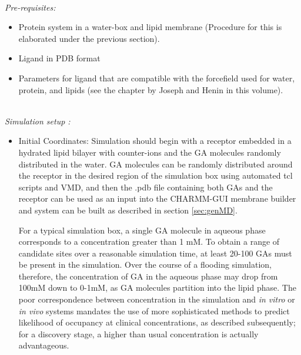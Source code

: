 \documentclass[12pt]{article}
\begin{document}
\hfill \break
\\
\textit{Pre-requisites:} 
\begin{itemize}
  \item Protein system in a water-box and lipid membrane (Procedure for this is elaborated under the previous section).
  \item Ligand in PDB format
  \item Parameters for ligand that are compatible with the forcefield used for water, protein, and lipids (see the chapter by Joseph and Henin in this volume).    
\end{itemize} \hfill \break
\\
\textit {Simulation setup :}
\begin{itemize}
 \item Initial Coordinates: Simulation should begin with a receptor embedded in a hydrated lipid bilayer with counter-ions and the GA molecules randomly distributed in the water.  GA molecules can be randomly distributed around the receptor in the desired region of the simulation box using automated tcl scripts and VMD, and then the .pdb file containing both GAs and the receptor can be used as an input into the CHARMM-GUI membrane builder and system can be built as described in section \ref{sec:genMD}.

For a typical simulation box, a single GA molecule in aqueous phase corresponds to a concentration greater than 1 mM.   To obtain a range of candidate sites over a reasonable simulation time, at least 20-100 GAs must be present in the simulation.  Over the course of a flooding simulation, therefore, the concentration of GA in the aqueous phase may drop from 100mM down to 0-1mM, as GA molecules partition into the lipid phase.   The poor correspondence between concentration in the simulation and {\it in vitro} or {\it in vivo} systems mandates the use of more sophisticated methods to predict likelihood of occupancy at clinical concentrations, as described subsequently; for a discovery stage, a higher than usual concentration is actually advantageous.   


\end{itemize}
\end{document}
